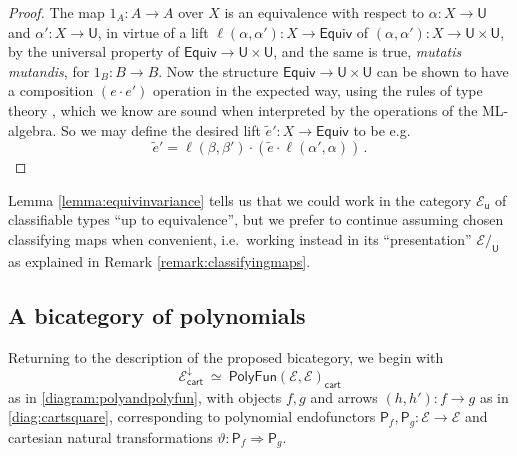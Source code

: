 \documentclass[12pt,reqno]{amsart}
\newcommand{\EE}{\ensuremath{\mathcal{E}}}
\newcommand{\alg}[1]{\ensuremath{\mathsf{#1}}}
\renewcommand{\to}{\ensuremath{\rightarrow}}
\renewcommand{\t}{\ensuremath{\mathsf{u}}}
\newcommand{\T}{\ensuremath{\mathsf{U}}}
\theoremstyle{remark}
\theoremstyle{definition}
\begin{document}
\begin{proof}
The map $1_A : A \to A$ over $X$ is an equivalence with respect to $\alpha: X \to \T$ and $\alpha': X \to \T$, in virtue of a lift $\ell(\alpha, \alpha') : X \to\mathsf{Equiv}$ of $(\alpha, \alpha') : X \to \T\times \T$, by the universal property of $\mathsf{Equiv} \to \T\times \T$, and the same is true, \emph{mutatis mutandis}, for  $1_B : B \to B$.  Now the structure $\mathsf{Equiv} \to \T\times \T$ can be shown to have a composition $(e\cdot e')$ operation in the expected way, using the rules of type theory \cite[Theorem 4.7.1]{HoTTbook}, which we know are sound when interpreted by the operations of the ML-algebra.  So we may define the desired lift ${\tilde{e}}' : X \to \mathsf{Equiv}$ to be e.g. $${\tilde{e}}' = \ell(\beta, \beta') \cdot ({\tilde{e}}\cdot\ell(\alpha', \alpha))\,.$$
\end{proof}
%
Lemma \ref{lemma:equivinvariance} tells us that we could work in the category $\EE_\t$ of classifiable types ``up to equivalence'', but we prefer to continue assuming chosen classifying maps when convenient, i.e.\ working instead in its ``presentation'' $\EE/_\T$ as explained in Remark \ref{remark:classifyingmaps}.

\subsection{A bicategory of polynomials}\label{sec:2cells}

Returning to the description of the proposed bicategory, we begin with
\[
\EE^{\downarrow}_{\mathsf{cart}}\ \simeq\ \mathsf{PolyFun}(\EE, \EE)_{\mathsf{cart}}
\]
as in \eqref{diagram:polyandpolyfun}, with objects $f, g$ and arrows $(h, h') : f \to g$ as in \eqref{diag:cartsquare}, corresponding to polynomial endofunctors $\alg{P}_f, \alg{P}_g : \EE \to \EE$ and cartesian natural transformations $\vartheta : \alg{P}_f \Rightarrow \alg{P}_g$.
\end{document}
